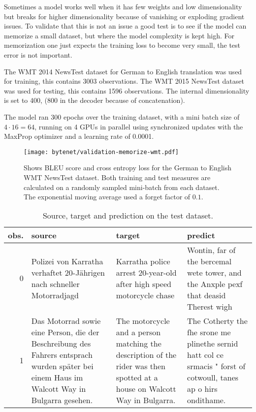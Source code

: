 Sometimes a model works well when it has few weights and low dimensionality but breaks for higher dimensionality because of vanishing or exploding gradient issues. To validate that this is not an issue a good test is to see if the model can memorize a small dataset, but where the model complexity is kept high. For memorization one just expects the training loss to become very small, the test error is not important.

The WMT 2014 NewsTest dataset for German to English translation was used for training, this contains 3003 observations. The WMT 2015 NewsTest dataset was used for testing, this contains 1596 observations. The internal dimensionality is set to 400, (800 in the decoder because of concatenation).

The model ran 300 epochs over the training dataset, with a mini batch size of $4 \cdot 16 = 64$, running on 4 GPUs in parallel using synchronized updates with the MaxProp optimizer and a learning rate of 0.0001.

\begin{figure}[h]
    \centering
    \texttt{[image: bytenet/validation-memorize-wmt.pdf]}
    \caption{Shows BLEU score and cross entropy loss for the German to English WMT NewsTest dataset. Both training and test measures are calculated on a randomly sampled mini-batch from each dataset. The exponential moving average used a forget factor of $0.1$.}
    \label{fig:result:bytenet:wmt}
\end{figure}

\begin{table}[h]
\centering
\begin{tabular}{r|p{3.3cm} p{3.3cm} p{3.3cm}}
	obs. & source & target & predict\\ \hline
  0 & Polizei von Karratha verhaftet 20-Jährigen nach schneller Motorradjagd & Karratha police arrest 20-year-old after high speed motorcycle chase & Wontin, far of the bercemal wete tower, and the Anxple pexf that deasid Therest wigh \\
  1 & Das Motorrad sowie eine Person, die der Beschreibung des Fahrers entsprach wurden später bei einem Haus im Walcott Way in Bulgarra gesehen. & The motorcycle and a person matching the description of the rider was then spotted at a house on Walcott Way in Bulgarra. & The Cotherty the fhe srone me plinethe sernid hatt col ce srmacis " forst of cotwoull, tanes ap o hirs ondithame.
\end{tabular}
\caption{Source, target and prediction on the test dataset.}
\label{table:result:bytenet:wmt-test}
\end{table}

